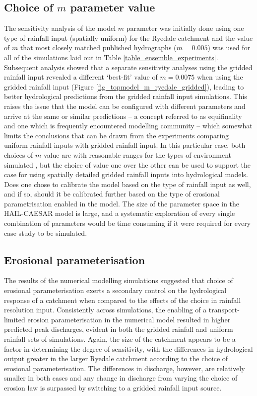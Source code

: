\subsection{Choice of \(m\) parameter value}
The sensitivity analysis of the model \(m\) parameter was initially done using one type of rainfall input (spatially uniform) for the Ryedale catchment and the value of \(m\) that most closely matched published hydrographs (\(m = 0.005\)) was used for all of the simulations laid out in Table \ref{table_ensemble_experiments}. Subsequent analysis showed that a separate sensitivity analyses using the gridded rainfall input revealed a different `best-fit' value of \(m=0.0075\) when using the gridded rainfall input (Figure \ref{fig_topmodel_m_ryedale_gridded}), leading to better hydrological predictions from the gridded rainfall input simulations. This raises the issue that the model can be configured with different parameters and arrive at the same or similar predictions -- a concept referred to as equifinality and one which is frequently encountered modelling community \citep{beven1993prophecy,beven2001equifinality,ebel2006physics} -- which somewhat limits the conclusions that can be drawn from the experiments comparing uniform rainfall inputs with gridded rainfall input. In this particular case, both choices of \(m\) value are with reasonable ranges for the types of environment simulated \citep{beven1984testing}, but the choice of value one over the other can be used to support the case for using spatially detailed gridded rainfall inputs into hydrological models. Does one chose to calibrate the model based on the type of rainfall input as well, and if so, should it be calibrated further based on the type of erosional parametrisation enabled in the model. The size of the parameter space in the HAIL-CAESAR model is large, and a systematic exploration of every single combination of parameters would be time consuming if it were required for every case study to be simulated.

\subsection{Erosional parameterisation}
The results of the numerical modelling simulations suggested that choice of erosional parameterisation exerts a secondary control on the hydrological response of a catchment when compared to the effects of the choice in rainfall resolution input. Consistently across simulations, the enabling of a transport-limited erosion parameterisation in the numerical model resulted in higher predicted peak discharges, evident in both the gridded rainfall and uniform rainfall sets of simulations. Again, the size of the catchment appears to be a factor in determining the degree of sensitivity, with the differences in hydrological output greater in the larger Ryedale catchment according to the choice of erosional parameterisation. The differences in discharge, however, are relatively smaller in both cases and any change in discharge from varying the choice of erosion law is surpassed by switching to a gridded rainfall input source. 

